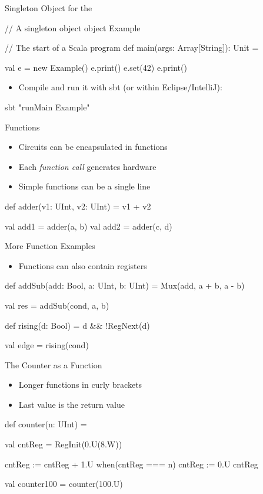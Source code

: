 \begin{frame}[fragile]{Singleton Object for the }
\begin{chisel}
// A singleton object
object Example {
  
  // The start of a Scala program
  def main(args: Array[String]): Unit = {
    
    val e = new Example()
    e.print()
    e.set(42)
    e.print()
  }
}
\end{chisel}
\begin{itemize}
\item Compile and run it with sbt (or within Eclipse/IntelliJ):
\end{itemize}
\begin{chisel}
sbt "runMain Example"
\end{chisel}
\end{frame}

\begin{frame}[fragile]{Functions}
\begin{itemize}
\item Circuits can be encapsulated in functions
\item Each \emph{function call} generates hardware
\item Simple functions can be a single line
\end{itemize}
\begin{chisel}
  def adder(v1: UInt, v2: UInt) = v1 + v2
  
  val add1 = adder(a, b)
  val add2 = adder(c, d)
\end{chisel}
\end{frame}

\begin{frame}[fragile]{More Function Examples}
\begin{itemize}
\item Functions can also contain registers
\end{itemize}
\begin{chisel}
  def addSub(add: Bool, a: UInt, b: UInt) =
    Mux(add, a + b, a - b)

  val res = addSub(cond, a, b)

  def rising(d: Bool) = d && !RegNext(d)

  val edge = rising(cond)
\end{chisel}
\end{frame}

\begin{frame}[fragile]{The Counter as a Function}
\begin{itemize}
\item Longer functions in curly brackets
\item Last value is the return value
\end{itemize}
\begin{chisel}
def counter(n: UInt) = {
  
  val cntReg = RegInit(0.U(8.W))
  
  cntReg := cntReg + 1.U
  when(cntReg === n) {
    cntReg := 0.U
  }
  cntReg
}

val counter100 = counter(100.U)
\end{chisel}
\end{frame}


